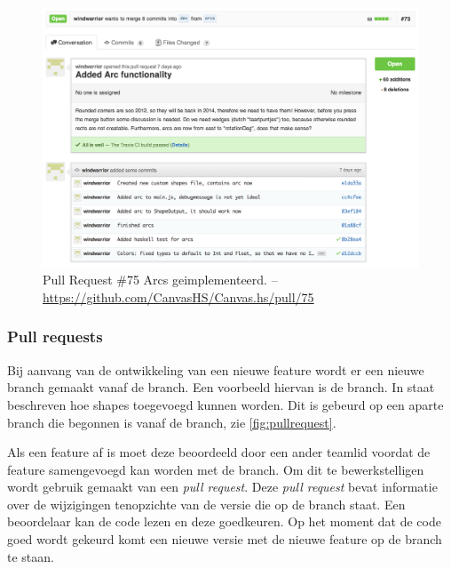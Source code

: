 \begin{figure}[H]
\begin{center}
\includegraphics[keepaspectratio,width=\textwidth]{./images/pullrequest.png}
\caption{Pull Request \#75 Arcs geimplementeerd. – \url{https://github.com/CanvasHS/Canvas.hs/pull/75}}
\label{fig:pullrequest}
\end{center}
\end{figure}

\subsubsection{Pull requests}
Bij aanvang van de ontwikkeling van een nieuwe feature wordt er een nieuwe branch gemaakt vanaf de  branch. Een voorbeeld hiervan is de  branch. In  staat beschreven hoe  shapes toegevoegd kunnen worden. Dit is gebeurd op een aparte branch die begonnen is vanaf de  branch, zie \autoref{fig:pullrequest}.

Als een feature af is moet deze beoordeeld door een ander teamlid voordat de feature samengevoegd kan worden met de  branch. Om dit te bewerkstelligen wordt gebruik gemaakt van een \emph{pull request}. Deze \emph{pull request} bevat informatie over de wijzigingen tenopzichte van de versie die op de  branch staat. Een beoordelaar kan de code lezen en deze goedkeuren. Op het moment dat de code goed wordt gekeurd komt een nieuwe versie met de nieuwe feature op de  branch te staan.

